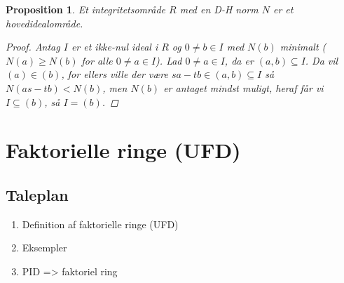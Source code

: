 \documentclass[10pt,twoside,openany,final]{memoir}
\theoremstyle{break}
\newtheorem{proposition}[section]{Proposition}
\theoremstyle{Break}
\begin{document}
\begin{proposition}
Et integritetsområde $R$ med en D-H norm $N$ er et hovedidealområde.
\begin{proof}
Antag $I$ er et ikke-nul ideal i $R$ og $0 \neq b \in I$ med $N(b)$ minimalt ($N(a) \geq N(b)$ for alle $0 \neq a \in I$). Lad $0 \neq a \in I$, da er $(a,b) \subseteq I$. Da vil $(a) \in (b)$, for ellers ville der være $sa-tb \in (a,b) \subseteq I$ så $N(as-tb) < N(b)$, men $N(b)$ er antaget mindst muligt, heraf får vi $I \subseteq (b)$, så $I=(b)$.
\end{proof}
\end{proposition}



\chapter{Faktorielle ringe (UFD)}
\section*{Taleplan}
\begin{enumerate}
\item Definition af faktorielle ringe (UFD)
\item Eksempler
\item PID => faktoriel ring
\end{enumerate}
\end{document}
